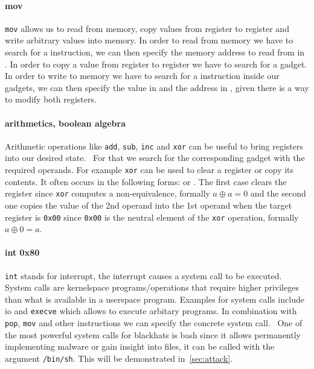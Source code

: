 \documentclass[journal=tosc,submission, notanonymous]{iacrtrans}
\begin{document}
\paragraph{mov}
\Verb+mov+ allows us to read from memory, copy values from register to register and write arbitrary values into memory. In order to read from memory we have to search for a  instruction, we can then specify the memory address to read from in . In order to copy a value from register to register we have to search for a  gadget. In order to write to memory we have to search for a  instruction inside our gadgets, we can then specify the value in  and the address in , given there is a way to modify both registers.
\paragraph{arithmetics, boolean algebra}
Arithmetic operations like \Verb+add+, \Verb+sub+, \Verb+inc+ and \Verb+xor+ can be useful to bring registers into our desired state.~\cite{ropsla} For that we search for the corresponding gadget with the required operands. For example \Verb+xor+ can be used to clear a register or copy its contents. It often occurs in the following forms:  or . The first case clears the register since \Verb+xor+ computes a non-equivalence, formally $a \oplus a = 0$ and the second one copies the value of the 2nd operand into the 1st operand when the target register is \Verb+0x00+ since \Verb+0x00+ is the neutral element of the \Verb+xor+ operation, formally $a \oplus 0 = a$.
\paragraph{int 0x80}
\Verb+int+ stands for interrupt, the interrupt  causes a system call to be executed. System calls are kernelspace programs/operations that require higher privileges than what is available in a userspace program. Examples for system calls include io and \Verb+execve+ which allows to execute arbitary programs. In combination with \Verb+pop+, \Verb+mov+ and other instructions we can specify the concrete system call.~\cite{ropsla} One of the most powerful system calls for blackhats is bash since it allows permanently implementing malware or gain insight into files, it can be called with the argument \Verb+/bin/sh+. This will be demonstrated in~\cref{sec:attack}.
\end{document}
